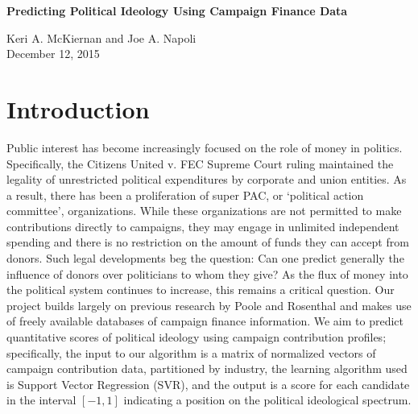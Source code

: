 \documentclass[12]{article}
\begin{document}
\begin{center}
\huge{\textbf{Predicting Political Ideology Using Campaign Finance Data}} \\
\end{center}
\begin{center}
\large{Keri A. McKiernan and Joe A. Napoli \\
\vspace{.25em}
December 12, 2015}
\end{center}
\section*{Introduction}

\noindent Public interest has become increasingly focused on the role of money in politics. Specifically, the Citizens United v. FEC Supreme Court ruling maintained the legality of unrestricted political expenditures by corporate and union entities. As a result, there has been a proliferation of super PAC, or `political action committee',  organizations. While these organizations are not permitted to make contributions directly to campaigns, they may engage in unlimited independent spending and there is no restriction on the amount of funds they can accept from donors. Such legal developments beg the question: Can one predict generally the influence of donors over politicians to whom they give? As the flux of money into the political system continues to increase, this remains a critical question. Our project builds largely on previous research by Poole and Rosenthal and makes use of freely available databases of campaign finance information. We aim to predict quantitative scores of political ideology using campaign contribution profiles; specifically, the input to our algorithm is a matrix of normalized vectors of campaign contribution data, partitioned by industry, the learning algorithm used is Support Vector Regression (SVR), and the output is a score for each candidate in the interval $[-1,1]$ indicating a position on the political ideological spectrum.
\end{document}
